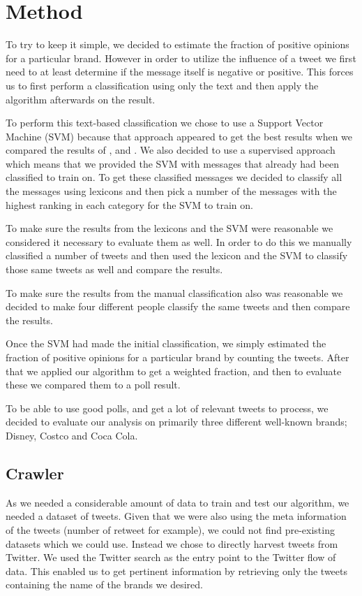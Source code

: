 \documentclass[a4paper,12pt]{report}
\begin{document}
\chapter{Method}

To try to keep it simple, we decided to estimate the fraction of positive opinions for a particular brand.
However in order to utilize the influence of a tweet we first need to at least determine if the message itself is negative or positive.
This forces us to first perform a classification using only the text and then apply the algorithm afterwards on the result.

To perform this text-based classification we chose to use a Support Vector Machine (SVM) because that approach appeared to get the best results when we compared the results of \cite{Pang02}, \cite{Turney02} and \cite{Taboada10}.
We also decided to use a supervised approach which means that we provided the SVM with messages that already had been classified to train on.
To get these classified messages we decided to classify all the messages using lexicons and then pick a number of the messages with the highest ranking in each category for the SVM to train on.

To make sure the results from the lexicons and the SVM were reasonable we considered it necessary to evaluate them as well. 
In order to do this we manually classified a number of tweets and then used the lexicon and the SVM to classify those same tweets as well and compare the results.

To make sure the results from the manual classification also was reasonable we decided to make four different people classify the same tweets and then compare the results.

Once the SVM had made the initial classification, we simply estimated the fraction of positive opinions for a particular brand by counting the tweets. After that we applied our algorithm to get a weighted fraction, and then to evaluate these we compared them to a poll result.

To be able to use good polls, and get a lot of relevant tweets to process, we decided to evaluate our analysis on primarily three different well-known brands; Disney, Costco and Coca Cola.

\section{Crawler}

As we needed a considerable amount of data to train and test our algorithm, we needed a dataset of tweets. 
Given that we were also using the meta information of the tweets (number of retweet for example), we could not find pre-existing datasets which we could use.
Instead we chose to directly harvest tweets from Twitter.
We used the Twitter search as the entry point to the Twitter flow of data. 
This enabled us to get pertinent information by retrieving only the tweets containing the name of the brands we desired.
\end{document}
